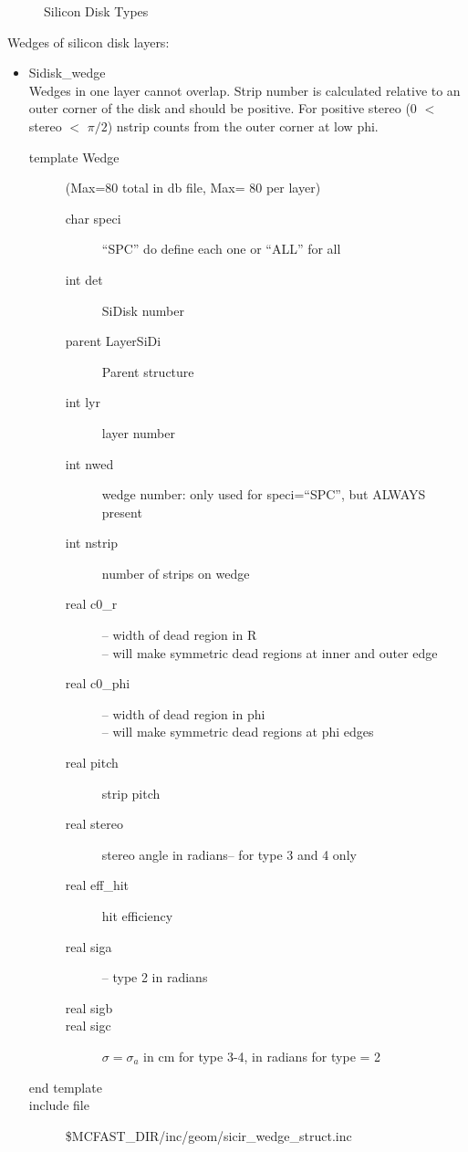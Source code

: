 \begin{itemize}
\begin{figure} [htbp]
\centerline{\epsfxsize=6.0in }
\caption{\label{sid_type} Silicon Disk Types}
\end{figure}

Wedges of silicon disk layers:

\begin{itemize}
\item Sidisk\_wedge  \\
Wedges in one layer cannot overlap.
Strip number is calculated relative to an outer corner of the disk and should be positive.
For positive stereo (0 $<$ stereo $<$ $\pi/2$) nstrip counts from the outer corner at low phi.
\begin{description}
\item[{\rm template} Wedge](Max=80 total in db file, Max= 80 per layer)
\begin{description}
\item[{\rm  char} speci]         ``SPC'' do define each one or ``ALL'' for all
\item[{\rm  int} det]     SiDisk number
\item[{\rm  parent} LayerSiDi] Parent structure
\item[{\rm  int} lyr]    layer number
\item[{\rm  int} nwed]   wedge number: only used for speci=``SPC'', but ALWAYS present
\item[{\rm  int} nstrip] number of strips on wedge
\item[{\rm  real} c0\_r] -- width of dead region in R\\
--  will make symmetric dead regions at inner and outer edge
\item[{\rm  real} c0\_phi] -- width of dead region in phi\\
-- will make symmetric dead regions at phi edges
\item[{\rm  real} pitch]  strip pitch  
\item[{\rm  real} stereo] stereo angle in radians-- for type 3 and 4 only
\item[{\rm  real} eff\_hit]  hit efficiency
\item[{\rm  real} siga]  -- type 2 in radians
\item[{\rm  real} sigb]  
\item[{\rm  real} sigc] 
$\sigma = \sigma_a$ in cm for type 3-4, in radians for type = 2
\end{description}
\item[end template]
\item[include file] \$MCFAST\_DIR/inc/geom/sicir\_wedge\_struct.inc
\end{description}
\end{itemize}
\end{itemize}

